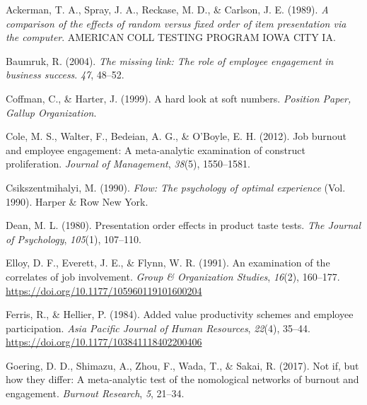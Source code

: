 \documentclass[
  man]{apa6}
\newlength{\cslhangindent}
\newlength{\cslentryspacingunit} %
\newenvironment{CSLReferences}[2] %
 {%
  \setlength{\parindent}{0pt}
  \ifodd #1
  \let\oldpar\par
  \def\par{\hangindent=\cslhangindent\oldpar}
  \fi
  \setlength{\parskip}{#2\cslentryspacingunit}
 }%
 {}
\begin{document}
\hypertarget{refs}{}
\begin{CSLReferences}{1}{0}
\leavevmode{}%
Ackerman, T. A., Spray, J. A., Reckase, M. D., \& Carlson, J. E. (1989). \emph{A comparison of the effects of random versus fixed order of item presentation via the computer}. AMERICAN COLL TESTING PROGRAM IOWA CITY IA.

\leavevmode{}%
Baumruk, R. (2004). \emph{The missing link: The role of employee engagement in business success}. \emph{47}, 48--52.

\leavevmode{}%
Coffman, C., \& Harter, J. (1999). A hard look at soft numbers. \emph{Position Paper, Gallup Organization}.

\leavevmode{}%
Cole, M. S., Walter, F., Bedeian, A. G., \& O'Boyle, E. H. (2012). Job burnout and employee engagement: A meta-analytic examination of construct proliferation. \emph{Journal of Management}, \emph{38}(5), 1550--1581.

\leavevmode{}%
Csikszentmihalyi, M. (1990). \emph{Flow: The psychology of optimal experience} (Vol. 1990). Harper \& Row New York.

\leavevmode{}%
Dean, M. L. (1980). Presentation order effects in product taste tests. \emph{The Journal of Psychology}, \emph{105}(1), 107--110.

\leavevmode{}%
Elloy, D. F., Everett, J. E., \& Flynn, W. R. (1991). An examination of the correlates of job involvement. \emph{Group \& Organization Studies}, \emph{16}(2), 160--177. \url{https://doi.org/10.1177/105960119101600204}

\leavevmode{}%
Ferris, R., \& Hellier, P. (1984). Added value productivity schemes and employee participation. \emph{Asia Pacific Journal of Human Resources}, \emph{22}(4), 35--44. \url{https://doi.org/10.1177/103841118402200406}

\leavevmode{}%
Goering, D. D., Shimazu, A., Zhou, F., Wada, T., \& Sakai, R. (2017). Not if, but how they differ: A meta-analytic test of the nomological networks of burnout and engagement. \emph{Burnout Research}, \emph{5}, 21--34.


\end{CSLReferences}
\end{document}
